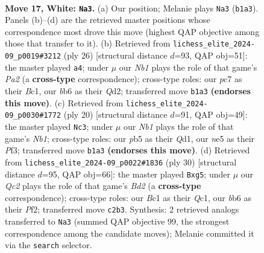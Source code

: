 \documentclass[11pt]{article}
\begin{document}
\clearpage

\begin{figure}[p]\centering
\begin{subfigure}{0.46\textwidth}\centering
\resizebox{\linewidth}{!}{%
\newchessgame
\chessboard[
  setfen={r2q4/1bp1k1pp/1b1p1n2/1p2n3/pP2P3/2P5/P1Q2PPP/RNB1RK2 w - - 0 17},
  showmover=false,
  pgfstyle=straightmove, color=movearrow, markmove={b1-a3}
]}
\caption{}
\end{subfigure}\hfill
\begin{subfigure}{0.46\textwidth}\centering
\resizebox{\linewidth}{!}{%
\newchessgame
\chessboard[
  setfen={r1bqr1k1/1p3pp1/p2p1n1p/4p3/4P3/2PP1N1P/P2Q1PP1/R1B1R1K1 w - - 0 14},
  showmover=false,
  pgfstyle=straightmove, color=movearrow, markmove={a2-a4}
]}
\caption{}
\end{subfigure}
\\[4pt]
\begin{subfigure}{0.46\textwidth}\centering
\resizebox{\linewidth}{!}{%
\newchessgame
\chessboard[
  setfen={r2qkb1r/1p3ppp/p1nppn2/8/3PP3/5P2/PP3P1P/RNBQRBK1 w kq - 1 11},
  showmover=false,
  pgfstyle=straightmove, color=movearrow, markmove={b1-c3}
]}
\caption{}
\end{subfigure}\hfill
\begin{subfigure}{0.46\textwidth}\centering
\resizebox{\linewidth}{!}{%
\newchessgame
\chessboard[
  setfen={3q1r2/p4pbk/bpPpp1p1/4n1p1/2P5/2N3P1/PP1BPP1P/R1Q2RK1 w - - 1 16},
  showmover=false,
  pgfstyle=straightmove, color=movearrow, markmove={d2-g5}
]}
\caption{}
\end{subfigure}
\caption{\textbf{Move 17, White: \texttt{Na3}.} (a) Our position; Melanie plays \texttt{Na3} (\texttt{b1a3}). Panels (b)--(d) are the retrieved master positions whose correspondence most drove this move (highest QAP objective among those that transfer to it). (b) Retrieved from \texttt{lichess\_elite\_2024-09\_p0019\#3212} (ply 26) [structural distance $d$=93, QAP obj=51]: the master played \texttt{a4}; under $\mu$ our \emph{Nb1} plays the role of that game's \emph{Pa2} (a \textbf{cross-type} correspondence); cross-type roles: our \emph{p}c7 as their \emph{B}c1, our \emph{b}b6 as their \emph{Q}d2; transferred move \texttt{b1a3} \textbf{(endorses this move)}. (c) Retrieved from \texttt{lichess\_elite\_2024-09\_p0030\#1772} (ply 20) [structural distance $d$=91, QAP obj=49]: the master played \texttt{Nc3}; under $\mu$ our \emph{Nb1} plays the role of that game's \emph{Nb1}; cross-type roles: our \emph{p}b5 as their \emph{Q}d1, our \emph{n}e5 as their \emph{P}f3; transferred move \texttt{b1a3} \textbf{(endorses this move)}. (d) Retrieved from \texttt{lichess\_elite\_2024-09\_p0022\#1836} (ply 30) [structural distance $d$=95, QAP obj=66]: the master played \texttt{Bxg5}; under $\mu$ our \emph{Qc2} plays the role of that game's \emph{Bd2} (a \textbf{cross-type} correspondence); cross-type roles: our \emph{B}c1 as their \emph{Q}c1, our \emph{b}b6 as their \emph{P}f2; transferred move \texttt{c2b3}. Synthesis: 2 retrieved analogs transferred to \texttt{Na3} (summed QAP objective 99, the strongest correspondence among the candidate moves); Melanie committed it via the \texttt{search} selector.}
\label{fig:thought-m32}
\end{figure}
\end{document}
